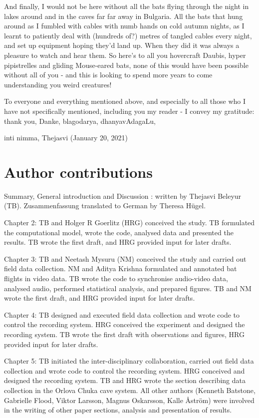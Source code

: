 \documentclass[
]{book}
\begin{document}
And finally, I would not be here without all the bats flying through the night in lakes around and in the caves far far away in Bulgaria. All the bats that hung around as I fumbled with cables with numb hands on cold autumn nights, as I learnt to patiently deal with (hundreds of?) metres of tangled cables every night, and set up equipment hoping they'd land up. When they did it was always a pleasure to watch and hear them. So here's to all you hovercraft Daubis, hyper pipistrelles and gliding Mouse-eared bats, none of this would have been possible without all of you - and this is looking to spend more years to come understanding you weird creatures!

To everyone and everything mentioned above, and especially to all those who I have not specifically mentioned, including you my reader - I convey my gratitude: thank you, Danke, blagodarya, dhanyavAdagaLu,

inti nimma,
Thejasvi (January 20, 2021)

\hypertarget{author-contributions-2}{%
\chapter{Author contributions}\label{author-contributions-2}}

Summary, General introduction and Discussion : written by Thejasvi Beleyur (TB).
Zusammenfassung translated to German by Theresa Hügel.

Chapter 2: TB and Holger R Goerlitz (HRG) conceived the study. TB formulated the computational model, wrote the code, analysed data and presented the results. TB wrote the first draft, and HRG provided input for later drafts.

Chapter 3: TB and Neetash Mysuru (NM) conceived the study and carried out field data collection. NM and Aditya Krishna formulated and annotated bat flights in video data. TB wrote the code to synchronise audio-video data, analysed audio, performed statistical analysis, and prepared figures. TB and NM wrote the first draft, and HRG provided input for later drafts.

Chapter 4: TB designed and executed field data collection and wrote code to control the recording system. HRG conceived the experiment and designed the recording system. TB wrote the first draft with observations and figures, HRG provided input for later drafts.

Chapter 5: TB initiated the inter-disciplinary collaboration, carried out field data collection and wrote code to control the recording system. HRG conceived and designed the recording system. TB and HRG wrote the section describing data collection in the Orlova Chuka cave system. All other authors (Kenneth Batstone, Gabrielle Flood, Viktor Larsson, Magnus Oskarsson, Kalle Åström) were involved in the writing of other paper sections, analysis and presentation of results.
\end{document}
